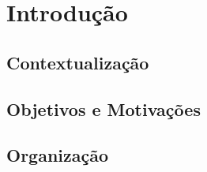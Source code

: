 
\chapter{Introdução}
\label{cap:introducao}


\section{Contextualização}






\section{Objetivos e Motivações}



 


\section{Organização}


